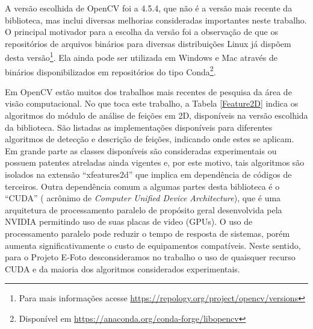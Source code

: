 A versão escolhida de OpenCV foi a 4.5.4, que não é a versão mais recente da biblioteca, mas inclui diversas melhorias consideradas importantes neste trabalho. O principal motivador para a escolha da versão foi a observação de que os repositórios de arquivos binários para diversas distribuições Linux já dispõem desta versão\footnote{Para mais informações acesse \url{https://repology.org/project/opencv/versions}}. Ela ainda pode ser utilizada em Windows e Mac através de binários disponibilizados em repositórios do tipo Conda\footnote{Disponível em \url{https://anaconda.org/conda-forge/libopencv}}.

Em OpenCV estão muitos dos trabalhos mais recentes de pesquisa da área de visão computacional. No que toca este trabalho, a Tabela \ref{Feature2D} indica os algoritmos do módulo de análise de feições em 2D, disponíveis na versão escolhida da biblioteca. São listadas as implementações disponíveis para diferentes algoritmos de detecção e descrição de feições, indicando onde estes se aplicam. Em grande parte as classes disponíveis são consideradas experimentais ou possuem patentes atreladas ainda vigentes e, por este motivo, tais algoritmos são isolados na extensão ``xfeatures2d'' que implica em dependência de códigos de terceiros. Outra dependência comum a algumas partes desta biblioteca é o ``CUDA'' ( acrônimo de \textit{Computer Unified Device Architecture}), que é uma arquitetura de processamento paralelo de propósito geral desenvolvida pela NVIDIA permitindo uso de suas placas de video (GPUs). O uso de processamento paralelo pode reduzir o tempo de resposta de sistemas, porém aumenta significativamente o custo de equipamentos compatíveis. Neste sentido, para o Projeto E-Foto desconsideramos no trabalho o uso de quaisquer recurso CUDA e da maioria dos algoritmos considerados experimentais.

